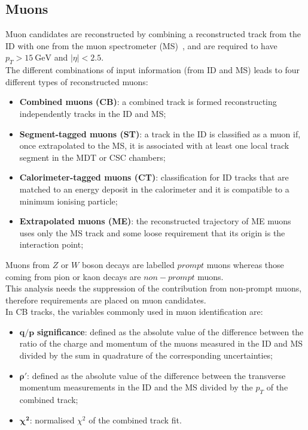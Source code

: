 \subsection{Muons}
\label{sec:object:mu}
Muon candidates are reconstructed by combining a reconstructed track
from the ID with one from the muon spectrometer
(MS)~\cite{PERF-2015-10}, and are required to have $p_{T}>\SI{15}{\GeV}$
and $|\eta|<2.5$. \\
The different combinations of input information (from ID and MS) leads to four different
types of reconstructed muons:
\begin{itemize}
\item \textbf{Combined muons (CB)}: a combined track is formed reconstructing independently tracks in the ID and MS;
\item \textbf{Segment-tagged muons (ST)}: a track in the ID is classified as a muon if, once
extrapolated to the MS, it is associated with at least one local track segment
in the MDT or CSC chambers;
\item \textbf{Calorimeter-tagged muons (CT)}: classification for ID tracks that are matched to an 
energy deposit in the calorimeter and it is compatible to a minimum ionising particle;
\item \textbf{Extrapolated muons (ME)}: the reconstructed trajectory of ME muons uses only the
MS track and some loose requirement that its origin is the interaction point;
\end{itemize}
Muons from $Z$ or $W$ boson decays are labelled $prompt$ muons whereas those
coming from pion or kaon decays are $non-prompt$ muons. \\
This analysis needs the suppression of the contribution from non-prompt muons, therefore 
requirements are placed on muon candidates. \\
In CB tracks, the variables commonly used in muon identification are:
\begin{itemize}
	\item $\bm{q/p}$ \textbf{significance}: defined as the absolute value of the difference between the
ratio of the charge and momentum of the muons measured in the ID and MS
divided by the sum in quadrature of the corresponding uncertainties;
	\item $\bm{\rho'}$: defined as the absolute value of the difference between the transverse momentum
measurements in the ID and the MS divided by the $p_T$ of the combined
track;
	\item $\bm{\chi^2}$: normalised $\chi^2$ of the combined track fit.
\end{itemize}
